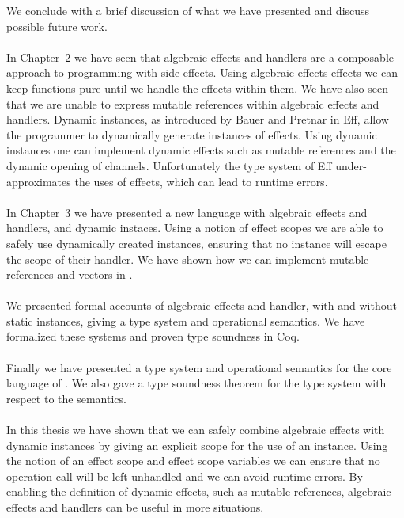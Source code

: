 We conclude with a brief discussion of what we have presented and discuss possible future work.
\\\\
In Chapter~2 we have seen that algebraic effects and handlers are a composable approach to programming with side-effects.
Using algebraic effects effects we can keep functions pure until we handle the effects within them.
We have also seen that we are unable to express mutable references within algebraic effects and handlers.
Dynamic instances, as introduced by Bauer and Pretnar in Eff, allow the programmer to dynamically generate instances of effects.
Using dynamic instances one can implement dynamic effects such as mutable references and the dynamic opening of channels.
Unfortunately the type system of Eff under-approximates the uses of effects, which can lead to runtime errors.
\\\\
In Chapter~3 we have presented a new language \lang{} with algebraic effects and handlers, and dynamic instaces.
Using a notion of effect scopes we are able to safely use dynamically created instances, ensuring that no instance will escape the scope of their handler.
We have shown how we can implement mutable references and vectors in \lang{}.
 \\\\
 We presented formal accounts of algebraic effects and handler, with and without static instances, giving a type system and operational semantics.
 We have formalized these systems and proven type soundness in Coq.
 \\\\
 Finally we have presented a type system and operational semantics for the core language of \lang{}.
 We also gave a type soundness theorem for the type system with respect to the semantics.
 \\\\
 In this thesis we have shown that we can safely combine algebraic effects with dynamic instances by giving an explicit scope for the use of an instance.
Using the notion of an effect scope and effect scope variables we can ensure that no operation call will be left unhandled and we can avoid runtime errors.
By enabling the definition of dynamic effects, such as mutable references, algebraic effects and handlers can be useful in more situations.
 
